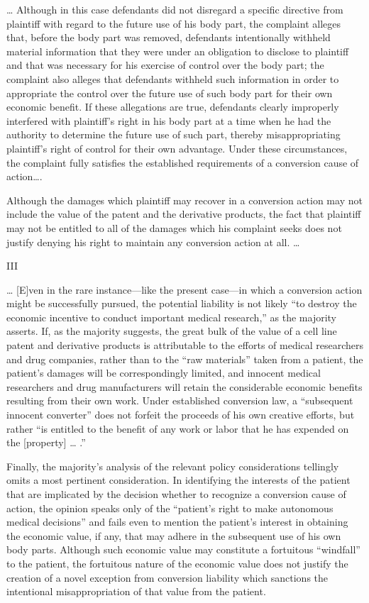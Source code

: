{\dots} Although in this case defendants did not disregard a specific directive
from plaintiff with regard to the future use of his body part, the complaint
alleges that, before the body part was removed, defendants intentionally
withheld material information that they were under an obligation to disclose to
plaintiff and that was necessary for his exercise of control over the body
part; the complaint also alleges that defendants withheld such information in
order to appropriate the control over the future use of such body part for
their own economic benefit. If these allegations are true, defendants clearly
improperly interfered with plaintiff's right in his body part at a time when he
had the authority to determine the future use of such part, thereby
misappropriating plaintiff's right of control for their own advantage. Under
these circumstances, the complaint fully satisfies the established requirements
of a conversion cause of action{\dots}.

Although the damages which plaintiff may recover in a conversion action may not
include the value of the patent and the derivative products, the fact that
plaintiff may not be entitled to all of the damages which his complaint seeks
does not justify denying his right to maintain any conversion action at all.
{\dots}

{\centering
III
\par}

{\dots} [E]ven in the rare instance---like the present case---in which a
conversion action might be successfully pursued, the potential liability is not
likely ``to destroy the economic incentive to conduct important medical
research,'' as the majority asserts. If, as the majority suggests, the great
bulk of the value of a cell line patent and derivative products is attributable
to the efforts of medical researchers and drug companies, rather than to the
``raw materials'' taken from a patient, the patient's damages will be
correspondingly limited, and innocent medical researchers and drug
manufacturers will retain the considerable economic benefits resulting from
their own work. Under established conversion law, a ``subsequent innocent
converter'' does not forfeit the proceeds of his own creative efforts, but
rather ``is entitled to the benefit of any work or labor that he has expended
on the [property] {\dots} .'' 

Finally, the majority's analysis of the relevant policy considerations tellingly
omits a most pertinent consideration. In identifying the interests of the
patient that are implicated by the decision whether to recognize a conversion
cause of action, the opinion speaks only of the ``patient's right to make
autonomous medical decisions'' and fails even to mention the patient's interest
in obtaining the economic value, if any, that may adhere in the subsequent use
of his own body parts. Although such economic value may constitute a fortuitous
``windfall'' to the patient, the fortuitous nature of the economic value does
not justify the creation of a novel exception from conversion liability which
sanctions the intentional misappropriation of that value from the patient.

